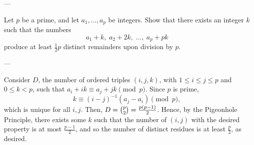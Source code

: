 
---

Let $p$ be a prime, and let $a_1,\ldots,a_p$ be integers. Show that there exists an integer $k$ such that the numbers \[a_1+k,\;a_2+2k,\;\ldots,\;a_p+pk\]
produce at least $\frac12p$ distinct remainders upon division by $p$.

---

Consider $D$, the number of ordered triples $(i,j,k)$, with $1\le i\le j\le p$ and $0\le k<p$, such that $a_i+ik\equiv a_j+jk\pmod p$. Since $p$ is prime, \[k\equiv (i-j)^{-1}(a_j-a_i)\pmod p,\]
which is unique for all $i,j$. Then, $D=\tbinom p2=\tfrac{p(p-1)}2$. Hence, by the Pigeonhole Principle, there exists some $k$ such that the number of $(i,j)$ with the desired property is at most $\tfrac{p-1}2$, and so the number of distinct residues is at least $\tfrac p2$, as desired. 
